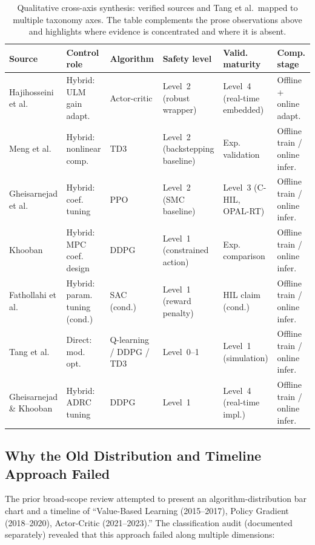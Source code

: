 \documentclass[manuscript,screen,review]{acmart}
\begin{document}
\begin{table}[t]
\caption{Qualitative cross-axis synthesis: verified sources and Tang et al.\ mapped to multiple taxonomy axes. The table complements the prose observations above and highlights where evidence is concentrated and where it is absent.}
\label{tab:cross-axis-synthesis}
\small
\begin{tabular}{p{2.4cm}p{1.8cm}p{1.5cm}p{1.5cm}p{1.5cm}p{1.5cm}}
\toprule
Source & Control role & Algorithm & Safety level & Valid. maturity & Comp. stage \\
\midrule
Hajihosseini et al.~\cite{hajihosseini2020dc} & Hybrid: ULM gain adapt. & Actor-critic & Level~2 (robust wrapper) & Level~4 (real-time embedded) & Offline + online adapt. \\
Meng et al.~\cite{meng2022novel} & Hybrid: nonlinear comp. & TD3 & Level~2 (backstepping baseline) & Exp. validation & Offline train / online infer. \\
Gheisarnejad et al.~\cite{gheisarnejad2022reducing} & Hybrid: coef. tuning & PPO & Level~2 (SMC baseline) & Level~3 (C-HIL, OPAL-RT) & Offline train / online infer. \\
Khooban~\cite{khooban2022smartenance} & Hybrid: MPC coef. design & DDPG & Level~1 (constrained action) & Exp. comparison & Offline train / online infer. \\
Fathollahi et al.~\cite{fathollahi2023robust} & Hybrid: param. tuning (cond.) & SAC (cond.) & Level~1 (reward penalty) & HIL claim (cond.) & Offline train / online infer. \\
Tang et al.~\cite{tang2020reinforcement,tang2021deep,tang2022deep} & Direct: mod. opt. & Q-learning / DDPG / TD3 & Level~0--1 & Level~1 (simulation) & Offline train / online infer. \\
\midrule
Gheisarnejad \& Khooban~\cite{gheisarnejad2020iot} & Hybrid: ADRC tuning & DDPG & Level~1 & Level~4 (real-time impl.) & Offline train / online infer. \\
\bottomrule
\end{tabular}
\end{table}

\subsection{Why the Old Distribution and Timeline Approach Failed}

The prior broad-scope review attempted to present an algorithm-distribution bar chart and a timeline of ``Value-Based Learning (2015--2017), Policy Gradient (2018--2020), Actor-Critic (2021--2023).''
The classification audit (documented separately) revealed that this approach failed along multiple dimensions:
\end{document}
